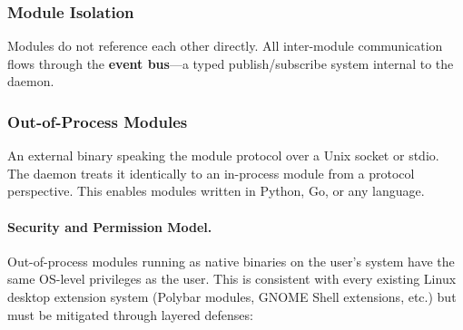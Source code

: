 \documentclass[11pt,a4paper]{article}
\begin{document}
\subsubsection{Module Isolation}
Modules do not reference each other directly. All inter-module communication flows through the \textbf{event bus}---a typed publish/subscribe system internal to the daemon.

\subsubsection{Out-of-Process Modules}
An external binary speaking the module protocol over a Unix socket or stdio. The daemon treats it identically to an in-process module from a protocol perspective. This enables modules written in Python, Go, or any language.

\paragraph{Security and Permission Model.}
Out-of-process modules running as native binaries on the user's system have the same OS-level privileges as the user. This is consistent with every existing Linux desktop extension system (Polybar modules, GNOME Shell extensions, etc.) but must be mitigated through layered defenses:
\end{document}

